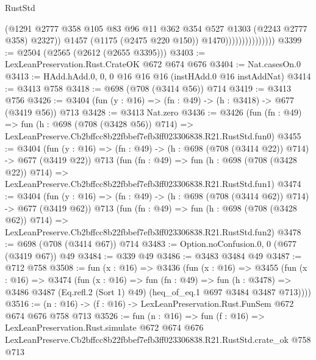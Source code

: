 \begin{lexlean}{RustStd}
\begin{coremodule}
                                    (@1291
                                      @2777
                                      @358
                                      @105
                                      @83
                                      @96
                                      @11
                                      @362
                                      @354
                                      @527
                                      @1303
                                      (@2243 @2777 @358)
                                      @2327))
                                  @1457
                                  (@1175 (@2475 @220 @150))
                                  @1470)))))))))))))))
@3399 := @2504 (@2565 (@2612 (@2655 @3395)))
@3403 := LexLeanPreservation.Rust.CrateOK @672 @674 @676
@3404 := Nat.casesOn.{0}
@3413 := HAdd.hAdd.{0, 0, 0} @16 @16 @16 (instHAdd.{0} @16 instAddNat)
@3414 := @3413 @758
@3418 := @698 (@708 (@3414 @56)) @714
@3419 := @3413 @756
@3426 := @3404 (fun (y : @16) => (fn : @49) -> (h : @3418) -> @677 (@3419 @56)) @713
@3428 := @3413 Nat.zero
@3436 := @3426
    (fun (fn : @49) =>
    fun (h : @698 (@708 (@3428 @56)) @714) =>
    LexLeanPreserve.Cb2bffcc8b22fbbef7efb3ff023306838.R21.RustStd.fun0)
@3455 := @3404
    (fun (y : @16) => (fn : @49) -> (h : @698 (@708 (@3414 @22)) @714) -> @677 (@3419 @22))
    @713
    (fun (fn : @49) =>
    fun (h : @698 (@708 (@3428 @22)) @714) =>
    LexLeanPreserve.Cb2bffcc8b22fbbef7efb3ff023306838.R21.RustStd.fun1)
@3474 := @3404
    (fun (y : @16) => (fn : @49) -> (h : @698 (@708 (@3414 @62)) @714) -> @677 (@3419 @62))
    @713
    (fun (fn : @49) =>
    fun (h : @698 (@708 (@3428 @62)) @714) =>
    LexLeanPreserve.Cb2bffcc8b22fbbef7efb3ff023306838.R21.RustStd.fun2)
@3478 := @698 (@708 (@3414 @67)) @714
@3483 := Option.noConfusion.{0, 0} (@677 (@3419 @67)) @49
@3484 := @339 @49
@3486 := @3483 @3484 @49
@3487 := @712 @758
@3508 := fun (x : @16) =>
  @3436
    (fun (x : @16) =>
    @3455
      (fun (x : @16) =>
      @3474
        (fun (x : @16) =>
        fun (fn : @49) =>
        fun (h : @3478) =>
        @3486 @3487 (Eq.refl.{2} (Sort 1) @49) (heq_of_eq.{1} @697 @3484 @3487 @713))))
@3516 := (n : @16) -> (f : @16) -> LexLeanPreservation.Rust.FunSem @672 @674 @676 @758 @713
@3526 := fun (n : @16) =>
  fun (f : @16) =>
  LexLeanPreservation.Rust.simulate
    @672
    @674
    @676
    LexLeanPreserve.Cb2bffcc8b22fbbef7efb3ff023306838.R21.RustStd.crate_ok
    @758
    @713
\end{coremodule}
\end{lexlean}
